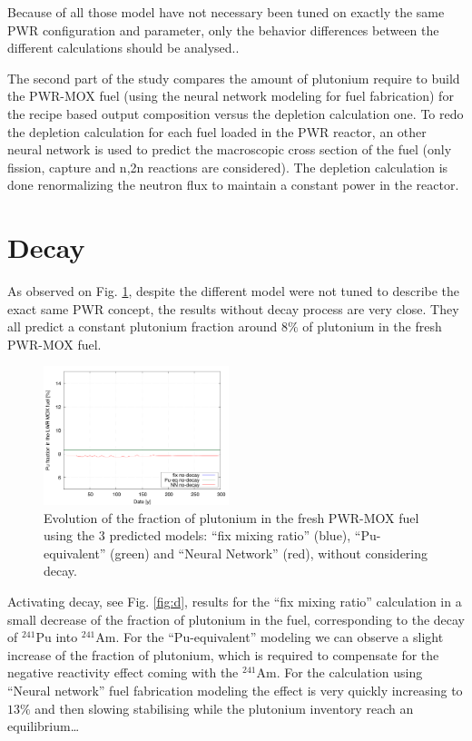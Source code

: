 \documentclass{anstrans}
\begin{document}
Because of all those model have not necessary been tuned on exactly the same
PWR configuration and parameter, only the behavior differences between the
different calculations should be analysed..


The second part of the study compares the amount of plutonium require to build
the PWR-MOX fuel (using the neural network modeling for fuel fabrication) for
the recipe based output composition versus the depletion calculation one.
To redo the depletion calculation for each fuel loaded in the PWR reactor, an
other neural network is used to predict the macroscopic cross section of the
fuel \cite{Leniau2015125} (only fission, capture and n,2n reactions are considered). The
depletion calculation is done renormalizing the neutron flux to maintain a
constant power in the reactor.


\section{Decay}


As observed on Fig. \ref{fig:nod}, despite the different model were not tuned to
describe the exact same PWR concept, the results without decay process are very
close. They all predict a constant plutonium fraction around $8\%$ of plutonium
in the fresh PWR-MOX fuel.

\begin{figure}[ht] %
  \centering
  \includegraphics[width=0.48\textwidth]{nodecay_pu_contribution.png}
  \caption{Evolution of the fraction of plutonium in the fresh PWR-MOX fuel
  using the 3 predicted models: ``fix mixing ratio'' (blue), ``Pu-equivalent''
  (green) and ``Neural Network'' (red), without considering decay.}
  \label{fig:nod}
\end{figure}


Activating decay, see Fig. \ref{fig:d}, results for the ``fix mixing ratio''
calculation in a small decrease of the fraction of plutonium in the fuel,
corresponding to the decay of $^{241}$Pu into $^{241}$Am. For the
``Pu-equivalent'' modeling we can observe a slight increase of the fraction of
plutonium, which is required to compensate for the negative reactivity effect
coming with the $^{241}$Am. For the calculation using ``Neural network'' fuel
fabrication modeling the effect is very quickly increasing to $13\%$ and then
slowing stabilising while the plutonium inventory reach an equilibrium\ldots
\end{document}
